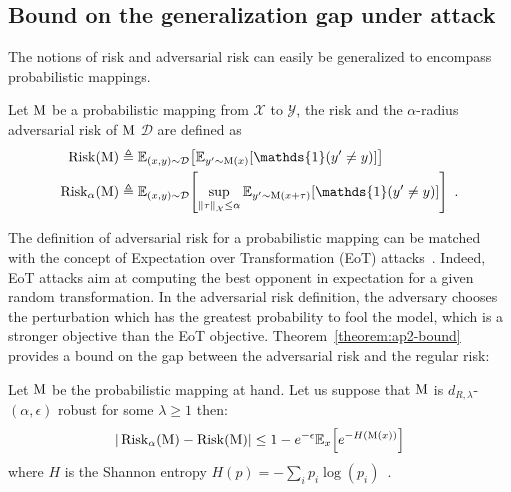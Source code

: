 \subsection{Bound on the generalization gap under attack}

The notions of risk and adversarial risk can easily be generalized to encompass probabilistic mappings.

\begin{definition}
  Let $\operatorname*{M}$ be a probabilistic mapping from $\mathcal{X}$ to $\mathcal{Y}$, the risk and the $\alpha$-radius adversarial risk of $\operatorname*{M}$ \wrt $\mathcal{D}$ are defined as 
  \begin{align}
    \Risk(\probmap) &\triangleq \mathbb{E}_{(x,y) \sim \mathcal{D}} \left[ \mathbb{E}_{y'\sim \probmap(x)} \left[ \mathds{1} \left( y' \neq y \right)\right]\right] \\
    \advRisk(\probmap) &\triangleq \mathbb{E}_{(x,y)\sim \mathcal{D}}\left[ \sup_{\norm{\tau}_{\mathcal{X}} \leq \alpha}\mathbb{E}_{y'\sim \probmap(x+\tau)} \left[ \mathds{1} \left( y' \neq y \right)\right]\right]\enspace.
  \end{align}
\end{definition}

The definition of adversarial risk for a probabilistic mapping can be matched with the concept of Expectation over Transformation (EoT) attacks~\cite{athalye2018obfuscated}.
Indeed, EoT attacks aim at computing the best opponent in expectation for a given random transformation.
In the adversarial risk definition, the adversary chooses the perturbation which has the greatest probability to fool the model, which is a stronger objective than the EoT objective.
Theorem~\ref{theorem:ap2-bound} provides a bound on the gap between the adversarial risk and the regular risk:

\begin{theorem}
  Let $\operatorname*{M}$ be the probabilistic mapping at hand.
  Let us suppose that  $\operatorname*{M}$ is $d_{R,\lambda}$-$(\alpha,\epsilon)$ robust for some $\lambda\geq1$ then:
  \begin{equation}
    |\advRisk(\probmap)-\Risk(\probmap)|\leq 1-e^{-\epsilon}\mathbb{E}_x\left[e^{-H(\probmap(x))}\right]
  \end{equation}
  where $H$ is the Shannon entropy $H(p)=-\sum_i p_i \log(p_i)\enspace.$
\label{theorem:ap2-bound}
\end{theorem}

